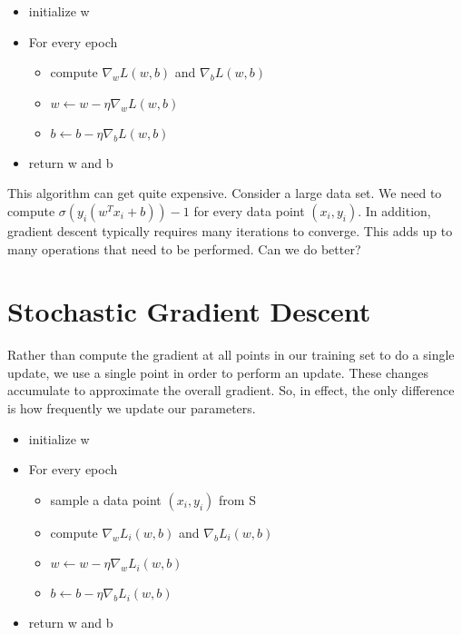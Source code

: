 \begin{itemize}
    \item initialize w
    \item For every epoch
    \begin{itemize}
        \item compute $\nabla_wL(w,b)$ and $\nabla_bL(w,b)$
        \item $w \gets w - \eta \nabla_w L(w,b)$
        \item $b \gets b - \eta \nabla_b L(w,b)$
    \end{itemize}
    \item return w and b
\end{itemize}

\vspace{.25cm}

This algorithm can get quite expensive. Consider a large data set. We need to compute $\sigma(y_i(w^Tx_i + b)) - 1$ for every data point $(x_i, y_i)$. In addition, gradient descent typically requires many iterations to converge. This adds up to many operations that need to be performed. Can we do better?

\section*{Stochastic Gradient Descent}
Rather than compute the gradient at all points in our training set to do a single update, we use a single point in order to perform an update. These changes accumulate to approximate the overall gradient. So, in effect, the only difference is how frequently we update our parameters.

\vspace{.25cm}

\begin{itemize}
    \item initialize w
    \item For every epoch
    \begin{itemize}
        \item sample a data point $(x_i, y_i)$ from S
        \item compute $\nabla_wL_i(w,b)$ and $\nabla_bL_i(w,b)$
        \item $w \gets w - \eta \nabla_w L_i(w,b)$
        \item $b \gets b - \eta \nabla_b L_i(w,b)$
    \end{itemize}
    \item return w and b
\end{itemize}

